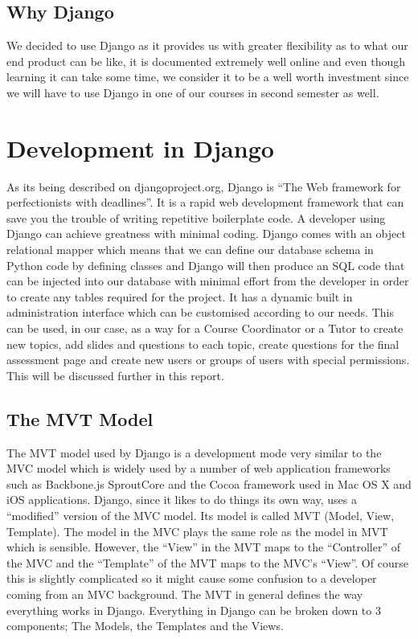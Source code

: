 \documentclass{l3proj}
\begin{document}
\subsection {Why Django}
We decided to use Django as it provides us with greater flexibility as to what our end product 
can be like, it is documented extremely well online and even though learning it can take 
some time, we consider it to be a well worth investment since we will have to use 
Django in one of our courses in second semester as well. 
\section{Development in Django}
As its being described on djangoproject.org, Django is ``The Web framework for 
perfectionists with deadlines''. It is a rapid web development framework that can save 
you the trouble of writing repetitive boilerplate code. A developer using Django can 
achieve greatness with minimal coding. Django comes with an object relational mapper 
which means that we can define our database schema in Python code by defining 
classes and Django will then produce an SQL code that can be injected into our database 
with minimal effort from the developer in order to create any tables required for the 
project. It has a dynamic built in administration interface which can be customised 
according to our needs. This can be used, in our case, as a way for a Course 
Coordinator or a Tutor to create new topics, add slides and questions to each topic, 
create questions for the final assessment page and create new users or groups of users 
with special permissions. This will be discussed further in this report.
\subsection{The MVT Model}
The MVT model used by Django is a development mode very similar to the MVC model which is widely used by a number of web application 
frameworks such as Backbone.js SproutCore and the Cocoa framework used in Mac OS X and iOS applications. Django, since it likes to do things its own way, uses a ``modified'' version of the MVC model. Its model is called MVT (Model, View, Template). The model in the MVC 
plays the same role as the model in MVT which is sensible. However, the ``View'' in the 
MVT maps to the ``Controller'' of the MVC and the ``Template'' of the MVT maps to the 
MVC's ``View''. Of course this is slightly complicated so it might cause some confusion to 
a developer coming from an MVC background. 
The MVT in general defines the way everything works in Django. Everything in Django 
can be broken down to 3 components; The Models, the Templates and the Views.
\end{document}
